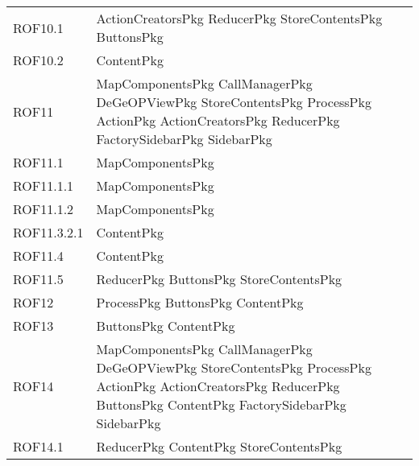 \begin{longtable}{p{2.5cm}!{\VRule[1pt]}p{5cm}}
		ROF10.1 & ActionCreatorsPkg \newline ReducerPkg \newline StoreContentsPkg \newline ButtonsPkg\\
		ROF10.2 & ContentPkg\\
		ROF11 & MapComponentsPkg \newline CallManagerPkg \newline DeGeOPViewPkg \newline StoreContentsPkg \newline ProcessPkg \newline ActionPkg \newline ActionCreatorsPkg \newline ReducerPkg \newline FactorySidebarPkg \newline SidebarPkg\\
		ROF11.1 & MapComponentsPkg\\
		ROF11.1.1 & MapComponentsPkg\\
		ROF11.1.2 & MapComponentsPkg\\
		ROF11.3.2.1 & ContentPkg\\
		ROF11.4 & ContentPkg\\
		ROF11.5 & ReducerPkg \newline ButtonsPkg \newline StoreContentsPkg\\
		ROF12 & ProcessPkg \newline ButtonsPkg \newline ContentPkg\\
		ROF13 & ButtonsPkg \newline ContentPkg\\
		ROF14 & MapComponentsPkg \newline CallManagerPkg \newline DeGeOPViewPkg \newline StoreContentsPkg \newline ProcessPkg \newline ActionPkg \newline ActionCreatorsPkg \newline ReducerPkg \newline ButtonsPkg \newline ContentPkg \newline FactorySidebarPkg \newline SidebarPkg\\
		ROF14.1 & ReducerPkg \newline ContentPkg \newline StoreContentsPkg\\

\end{longtable}
